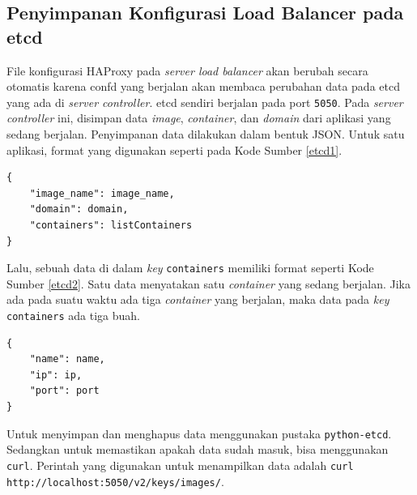         \subsection{Penyimpanan Konfigurasi Load Balancer pada etcd}
        	File konfigurasi HAProxy pada \textit{server load balancer} akan berubah secara otomatis karena confd yang berjalan akan membaca perubahan data pada etcd yang ada di \textit{server controller}. etcd sendiri berjalan pada port \texttt{5050}. Pada \textit{server controller} ini, disimpan data \textit{image}, \textit{container}, dan \textit{domain} dari aplikasi yang sedang berjalan. Penyimpanan data dilakukan dalam bentuk JSON. Untuk satu aplikasi, format yang digunakan seperti pada Kode Sumber \ref{etcd1}.
	\begin{lstlisting}[frame=single,tabsize=2,breaklines,caption={Format Penyimpanan Data \textit{Image} pada etcd},label=etcd1, captionpos=b]
{
	"image_name": image_name,
	"domain": domain,
	"containers": listContainers
}
	\end{lstlisting}
    
	\indent Lalu, sebuah data di dalam \textit{key} \texttt{containers} memiliki format seperti Kode Sumber \ref{etcd2}. Satu data menyatakan satu \textit{container} yang sedang berjalan. Jika ada pada suatu waktu ada tiga \textit{container} yang berjalan, maka data pada \textit{key} \texttt{containers} ada tiga buah.
    
    \begin{lstlisting}[frame=single,tabsize=2,breaklines,caption={Format Penyimpanan Data \textit{Container} pada etcd},label=etcd2, captionpos=b]
{
	"name": name,
	"ip": ip,
	"port": port
}    
	\end{lstlisting}
    
    \indent Untuk menyimpan dan menghapus data menggunakan pustaka \texttt{python-etcd}. Sedangkan untuk memastikan apakah data sudah masuk, bisa menggunakan \texttt{curl}. Perintah yang digunakan untuk menampilkan data adalah \texttt{curl http://localhost:5050/v2/keys/images/}.
    
